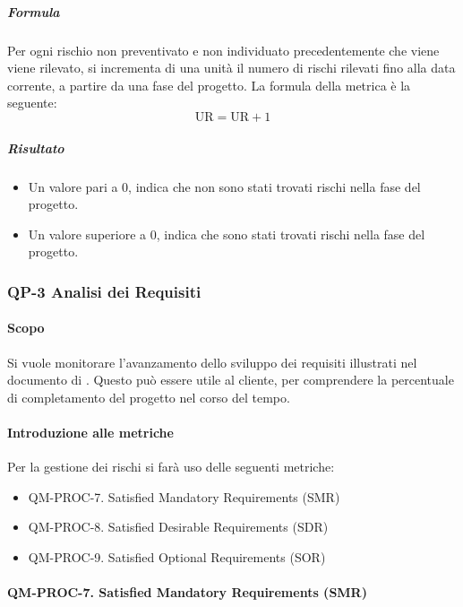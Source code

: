 			\subparagraph{Formula}
			Per ogni rischio non preventivato e non individuato precedentemente che viene viene rilevato, si incrementa di una unità il numero di rischi rilevati fino alla data corrente, a partire da una fase del progetto.
			La formula della metrica è la seguente:
			\[
				\text{UR} = \text{UR} + 1
			\]

			\subparagraph{Risultato}
			\begin{itemize}
				\item Un valore pari a 0, indica che non sono stati trovati rischi nella fase del progetto.
				\item Un valore superiore a 0, indica che sono stati trovati rischi nella fase del progetto.
			\end{itemize}

	\subsubsection{QP-3 Analisi dei Requisiti}

		\paragraph{Scopo}
		
		Si vuole monitorare l'avanzamento dello sviluppo dei requisiti illustrati nel documento di . Questo può essere utile al cliente, per comprendere la percentuale di completamento del progetto nel corso del tempo.

		\paragraph{Introduzione alle metriche}

		Per la gestione dei rischi si farà uso delle seguenti metriche:

		\begin{itemize}
			\item QM-PROC-7. Satisfied Mandatory Requirements (SMR)
			\item QM-PROC-8. Satisfied Desirable Requirements (SDR)
			\item QM-PROC-9. Satisfied Optional Requirements (SOR)
		\end{itemize}

		\paragraph{QM-PROC-7. Satisfied Mandatory Requirements (SMR)}

